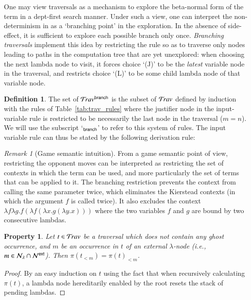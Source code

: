 \documentclass{elsarticle}
\makeatletter
\theoremstyle{plain}
\newtheorem{property}[theorem]{Property}
\theoremstyle{definition}
\newtheorem{definition}{Definition}[section]
\theoremstyle{remark}
\newtheorem{remark}{Remark}[section]
\newcommand\Nodes{\mathcal{N}}%
\newcommand\NodesVar{\Nodes_{\sf var}}%
\newcommand\NodesLmd{\Nodes_\lambda}%
\newcommand{\branching}{{\sf branch}}
\newcommand{\travsetbr}{{\travset^\branching}}
\newcommand{\travulc}{\travset}
\newcommand{\rulefont}[1]{\mathbf{\sf #1}}
\def\coresymbol{\pi} %
\newcommand{\core}[1]{\coresymbol(#1)} %
\newcommand{\enables}{\vdash} %
\newcommand{\ExtNodes}{\Nodes^{\sf ext}}
\renewcommand\ie{{\it i.e.\@\xspace}}
\makeatother
\begin{document}
One may view traversals as a mechanism to explore the beta-normal form of the term in a dept-first search manner. Under such a view, one can interpret the non-determinism in  as a `branching point' in the exploration. In the absence of side-effect, it is sufficient to explore each possible branch only once. \emph{Branching traversals} implement this idea by restricting the rule  so as to traverse only nodes leading to paths in the computation tree that are yet unexplored: when choosing the next lambda node to visit, it forces choice `(J)' to be the \emph{latest} variable node in the traversal, and restricts choice `(L)' to be some child lambda node of that variable node.

\begin{definition}
\label{dfn:branching_traversals}
The set of  $\travsetbr$ is the subset of $\travulc$ defined by induction with the rules of Table~\ref{tab:trav_rules} where the justifier node in the
input-variable rule  is restricted to be necessarily the last node in the traversal ($m=n$).
We will use the subscript `${}_\branching$' to refer to this system of rules. The input variable rule can thus be stated by the following derivation rule:
\infrule[$\rulefont{IVar_\branching}$]
     {t \cdot n \in\travsetbr
      \andalso n \in\ExtNodes\inter\NodesVar
      \andalso n \enables_i\alpha
      \andalso i \geq 1
     }
     { \in \travsetbr}
\end{definition}

\begin{remark}[Game semantic intuition]
From a game semantic point of view, restricting the opponent moves can be interpreted as restricting the set of contexts in which the term can be used, and more particularly the set of terms that can be applied to it.
The branching restriction prevents the context from calling the same parameter twice, which eliminates the Kierstead contexts (in which the argument $f$ is called twice). It also excludes the context $\lambda f \lambda g . f (\lambda f (\lambda x . g (\lambda y . x)))$ where the two variables $f$ and $g$ are bound by two consecutive lambdas.
\end{remark}

\begin{property}
\label{prop:core_truncation_at_externallambda}
Let $t\in\travulc$ be a traversal which does not contain any ghost occurrence, and $m$ be an occurrence in $t$ of an external $\lambda$-node (\ie, $m \in \NodesLmd\inter\ExtNodes$). Then $\core{t_{<m}} = \core{t}_{<m}$.
\end{property}
\begin{proof}
By an easy induction on $t$ using the fact that when recursively calculating $\coresymbol(t)$, a lambda node hereditarily enabled by the root resets the stack of pending lambdas.
\end{proof}
\end{document}
